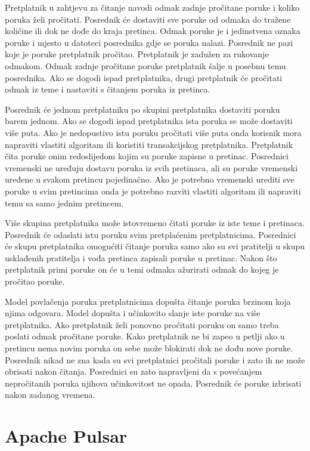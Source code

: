\documentclass[utf8, diplomski, lmodern, numeric]{fer}
\begin{document}
Pretplatnik u zahtjevu za čitanje navodi odmak zadnje pročitane poruke i koliko poruka želi pročitati. Posrednik će dostaviti sve poruke od odmaka do tražene količine ili dok ne dođe do kraja pretinca. Odmak poruke je i jedinstvena oznaka poruke i mjesto u datoteci posrednika gdje se poruka nalazi. Posrednik ne pazi koje je poruke pretplatnik pročitao. Pretplatnik je zadužen za rukovanje odmakom. Odmak zadnje pročitane poruke pretplatnik šalje u posebnu temu posrednika. Ako se dogodi ispad pretplatnika, drugi pretplatnik će pročitati odmak iz teme i nastaviti s čitanjem poruka iz pretinca.

Posrednik će jednom pretplatniku po skupini pretplatnika dostaviti poruku barem jednom. Ako se dogodi ispad pretplatnika ista poruka se može dostaviti više puta. Ako je nedopustivo istu poruku pročitati više puta onda korisnik mora napraviti vlastiti algoritam ili koristiti transakcijskog pretplatnika. Pretplatnik čita poruke onim redoslijedom kojim su poruke zapisne u pretinac. Posrednici vremenski ne uređuju dostavu poruka iz svih pretinaca, ali su poruke vremenski uređene u svakom pretincu pojedinačno. Ako je potrebno vremenski urediti sve poruke u svim pretincima onda je potrebno razviti vlastiti algoritam ili napraviti temu sa samo jednim pretincem.

Više skupina pretplatnika može istovremeno čitati poruke iz iste teme i pretinaca. Posrednik će odaslati  istu poruku svim pretplaćenim pretplatnicima. Posrednici će skupu pretplatnika omogućiti čitanje poruka samo ako su svi pratitelji u skupu usklađenih pratitelja i vođa pretinca zapisali poruke u pretinac. Nakon što pretplatnik primi poruke on će u temi odmaka ažurirati odmak do kojeg je pročitao poruke.

Model povlačenja  poruka pretplatnicima dopušta čitanje poruka brzinom koja njima odgovara. Model dopušta i učinkovito slanje iste poruke na više pretplatnika. Ako pretplatnik želi ponovno pročitati poruku on samo treba poslati odmak pročitane poruke. Kako pretplatnik ne bi zapeo u petlji ako u pretincu nema novim poruka on sebe može blokirati dok ne dođu nove poruke. Posrednik nikad ne zna kada su svi pretplatnici pročitali poruke i zato ih ne može obrisati nakon čitanja. Posrednici su zato napravljeni da s povećanjem nepročitanih poruka njihova učinkovitost ne opada. Posrednik će poruke izbrisati nakon zadanog vremena.


\section{Apache Pulsar}
\end{document}
